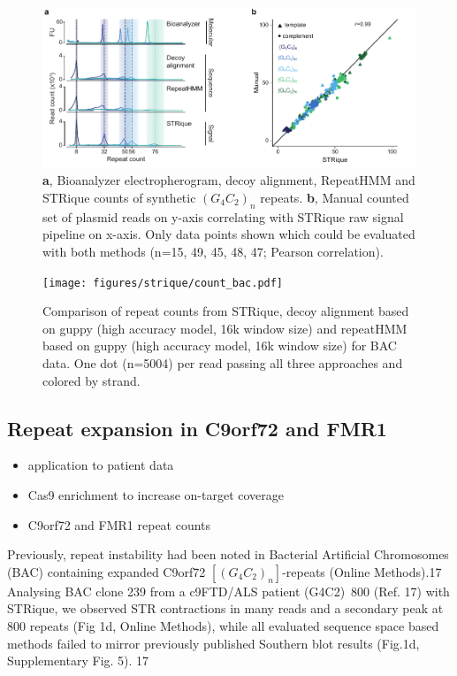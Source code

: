 \begin{figure}[h]
	\centering
	\includegraphics[width=1.0\textwidth]{figures/strique/count_signal_corr.pdf}
	\captionsetup{format=plain}
	\caption[Correlation and strand bias in STR analysis methods]{\textbf{a}, Bioanalyzer electropherogram, decoy alignment, RepeatHMM and STRique counts of synthetic $ (G_{4}C_{2})_{n} $ repeats. \textbf{b}, Manual counted set of plasmid reads on y-axis correlating with STRique raw signal pipeline on x-axis. Only data points shown which could be evaluated with both methods (n=15, 49, 45, 48, 47; Pearson correlation).}
	\label{fig:strique:count_signal_corr}
\end{figure}

\begin{figure}[h]
    \centering
    \texttt{[image: figures/strique/count\_bac.pdf]}
    \captionsetup{format=plain}
    \caption[Strand bias in sequence based repeat counts]{Comparison of repeat counts from STRique, decoy alignment based on guppy (high accuracy model, 16k window size) and repeatHMM based on guppy (high accuracy model, 16k window size) for BAC data. One dot (n=5004) per read passing all three approaches and colored by strand.}
    \label{fig:strique:count_bac}
\end{figure}


\subsection{Repeat expansion in C9orf72 and FMR1}
\label{subsec:strique:c9orf72}

\begin{itemize}
	\item application to patient data
	\item Cas9 enrichment to increase on-target coverage
	\item C9orf72 and FMR1 repeat counts
\end{itemize}

Previously, repeat instability had been noted in Bacterial Artificial Chromosomes (BAC) containing expanded C9orf72 $ [(G_{4}C_{2})_{n}] $-repeats (Online Methods).17 Analysing BAC clone 239 from a c9FTD/ALS patient (G4C2)~800 (Ref. 17) with STRique, we observed STR contractions in many reads and a secondary peak at 800 repeats (Fig 1d, Online Methods), while all evaluated sequence space based methods failed to mirror previously published Southern blot results (Fig.1d, Supplementary Fig. 5). 17


